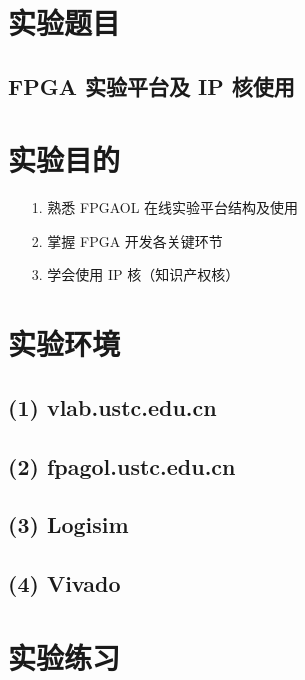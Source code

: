 \documentclass{article}
\begin{document}
    \section{实验题目}
        \subsection*{\qquad  FPGA 实验平台及 IP 核使用}
     
    \section{实验目的}
        \begin{enumerate}
            \item [1.]熟悉 FPGAOL 在线实验平台结构及使用
            \item [2.]掌握 FPGA 开发各关键环节
            \item [3.]学会使用 IP 核（知识产权核）
        \end{enumerate}
        
    \section{实验环境}
        \subsection*{\qquad (1) vlab.ustc.edu.cn}
        \subsection*{\qquad (2) fpagol.ustc.edu.cn}
        \subsection*{\qquad (3) Logisim}
        \subsection*{\qquad (4) Vivado}
    
    \clearpage
    \section{实验练习}
\end{document}

